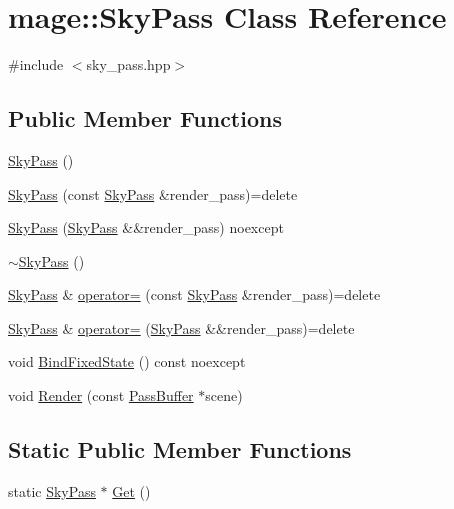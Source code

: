 \hypertarget{classmage_1_1_sky_pass}{}\section{mage\+:\+:Sky\+Pass Class Reference}
\label{classmage_1_1_sky_pass}


{\ttfamily \#include $<$sky\+\_\+pass.\+hpp$>$}

\subsection*{Public Member Functions}
\begin{DoxyCompactItemize}
\item 
\hyperlink{classmage_1_1_sky_pass_a41bb9d2d37f2c3a7bc5b12cffad9dafa}{Sky\+Pass} ()
\item 
\hyperlink{classmage_1_1_sky_pass_a78be688fecb0a4f55df78d4af01c4590}{Sky\+Pass} (const \hyperlink{classmage_1_1_sky_pass}{Sky\+Pass} \&render\+\_\+pass)=delete
\item 
\hyperlink{classmage_1_1_sky_pass_a86acd9fdb50c3c92a6c15632362aea47}{Sky\+Pass} (\hyperlink{classmage_1_1_sky_pass}{Sky\+Pass} \&\&render\+\_\+pass) noexcept
\item 
\hyperlink{classmage_1_1_sky_pass_ab3e581e2eedfc62e13c71d91359f71ce}{$\sim$\+Sky\+Pass} ()
\item 
\hyperlink{classmage_1_1_sky_pass}{Sky\+Pass} \& \hyperlink{classmage_1_1_sky_pass_acfb9531772b437603825e43d17f4d983}{operator=} (const \hyperlink{classmage_1_1_sky_pass}{Sky\+Pass} \&render\+\_\+pass)=delete
\item 
\hyperlink{classmage_1_1_sky_pass}{Sky\+Pass} \& \hyperlink{classmage_1_1_sky_pass_ae15ed24b3bbf4008b90e4cfcb4117a84}{operator=} (\hyperlink{classmage_1_1_sky_pass}{Sky\+Pass} \&\&render\+\_\+pass)=delete
\item 
void \hyperlink{classmage_1_1_sky_pass_aa74c5e32a917aac610b2c7e4750c4639}{Bind\+Fixed\+State} () const noexcept
\item 
void \hyperlink{classmage_1_1_sky_pass_a5f7cd1d2e66bd5fbe9893bd42d3d6547}{Render} (const \hyperlink{structmage_1_1_pass_buffer}{Pass\+Buffer} $\ast$scene)
\end{DoxyCompactItemize}
\subsection*{Static Public Member Functions}
\begin{DoxyCompactItemize}
\item 
static \hyperlink{classmage_1_1_sky_pass}{Sky\+Pass} $\ast$ \hyperlink{classmage_1_1_sky_pass_af608935f6cb4b631512ee9c9eb6dec9d}{Get} ()
\end{DoxyCompactItemize}
